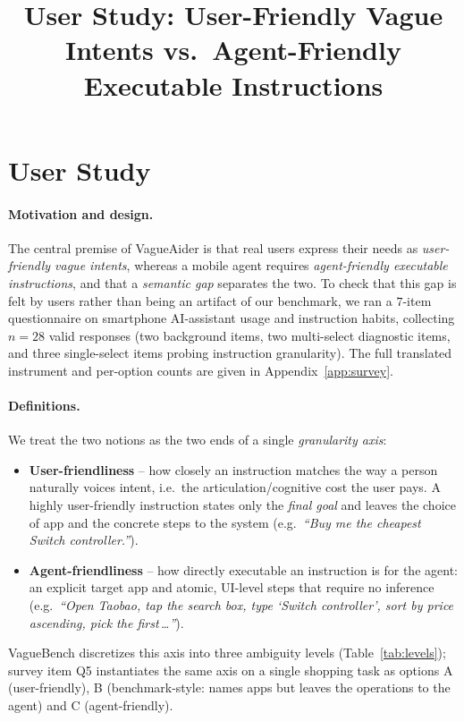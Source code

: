 \documentclass[11pt]{article}
\title{\vspace{-2em}User Study: User-Friendly Vague Intents vs.\ Agent-Friendly Executable Instructions}
\author{}
\date{}
\begin{document}
\maketitle


\section{User Study}
\label{sec:userstudy}

\paragraph{Motivation and design.}
The central premise of VagueAider is that real users express their needs as
\emph{user-friendly vague intents}, whereas a mobile agent requires
\emph{agent-friendly executable instructions}, and that a \emph{semantic gap}
separates the two. To check that this gap is felt by users rather than being an
artifact of our benchmark, we ran a $7$-item questionnaire on smartphone
AI-assistant usage and instruction habits, collecting $n{=}28$ valid responses
(two background items, two multi-select diagnostic items, and three
single-select items probing instruction granularity). The full translated
instrument and per-option counts are given in Appendix~\ref{app:survey}.

\paragraph{Definitions.}
We treat the two notions as the two ends of a single \emph{granularity axis}:
\begin{itemize}
  \item \textbf{User-friendliness} -- how closely an instruction matches the way
  a person naturally voices intent, i.e.\ the articulation/cognitive cost the
  user pays. A highly user-friendly instruction states only the \emph{final
  goal} and leaves the choice of app and the concrete steps to the system
  (e.g.\ \textit{``Buy me the cheapest Switch controller.''}).
  \item \textbf{Agent-friendliness} -- how directly executable an instruction is
  for the agent: an explicit target app and atomic, UI-level steps that require
  no inference (e.g.\ \textit{``Open Taobao, tap the search box, type `Switch
  controller', sort by price ascending, pick the first\,\ldots''}).
\end{itemize}
VagueBench discretizes this axis into three ambiguity levels
(Table~\ref{tab:levels}); survey item Q5 instantiates the same axis on a single
shopping task as options A (user-friendly), B (benchmark-style: names apps but
leaves the operations to the agent) and C (agent-friendly).
\end{document}
